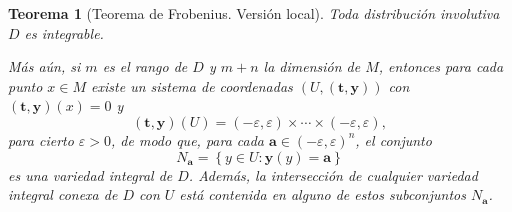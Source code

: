 \documentclass[11pt,a4paper]{amsbook}
\newtheorem{thm}[subsection]{Teorema}
\theoremstyle{remark} \newtheorem{rmk}[subsection]{Observación}
\theoremstyle{definition} \newtheorem{defn}[subsection]{Definición}
\theoremstyle{definition} \newtheorem{ex}[subsection]{Ejemplo}
\theoremstyle{definition} \newtheorem{ej}[subsection]{Ejercicio}
\begin{document}
\begin{thm}[Teorema de Frobenius. Versión local]
  Toda distribución involutiva $D$ es integrable.

  Más aún, si $m$ es el rango de $D$ y $m+n$ la dimensión de $M$, entonces para cada punto $x\in M$ existe un sistema de coordenadas $(U,(\bm{t},\bm{y}))$ con $(\bm{t},\bm{y})(x)=0$ y
  \begin{equation*}
(\bm{t},\bm{y})(U) = (-\varepsilon,\varepsilon) \times \cdots \times (-\varepsilon, \varepsilon),
  \end{equation*}
  para cierto $\varepsilon > 0$, de modo que, para cada $\bm{a} \in (-\varepsilon,\varepsilon)^n$, el conjunto
  \begin{equation*}
N_{\bm{a}}=\left\{ y \in U: \bm{y}(y)=\bm{a} \right\}
  \end{equation*}
es una variedad integral de $D$.
Además, la intersección de cualquier variedad integral conexa de $D$ con $U$ está contenida en alguno de estos subconjuntos $N_{\bm{a}}$.
\end{thm}
\end{document}
